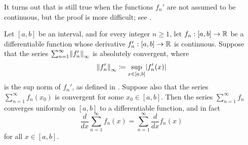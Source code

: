 \begin{rmk}\label{ii:3.7.2}
  It turns out that  is still true when the functions \(f_n'\) are not assumed to be continuous, but the proof is more difficult;
  see .
\end{rmk}

\begin{cor}\label{ii:3.7.3}
  Let \([a, b]\) be an interval, and for every integer \(n \geq 1\), let \(f_n : [a, b] \to \mathbb{R}\) be a differentiable function whose derivative \(f_n' : [a, b] \to \mathbb{R}\) is continuous.
  Suppose that the series \(\sum_{n = 1}^\infty \norm*{f_n'}_\infty\) is absolutely convergent, where
  \[
    \norm*{f_n'}_\infty \coloneqq \sup_{x \in [a, b]} \abs{f_n'(x)}
  \]
  is the sup norm of \(f_n'\), as defined in .
  Suppose also that the series \(\sum_{n = 1}^\infty f_n(x_0)\) is convergent for some \(x_0 \in [a, b]\).
  Then the series \(\sum_{n = 1}^\infty f_n\) converges uniformly on \([a, b]\) to a differentiable function, and in fact
  \[
    \dfrac{d}{dx} \sum_{n = 1}^\infty f_n(x) = \sum_{n = 1}^\infty \dfrac{d}{dx} f_n(x)
  \]
  for all \(x \in [a, b]\).
\end{cor}

